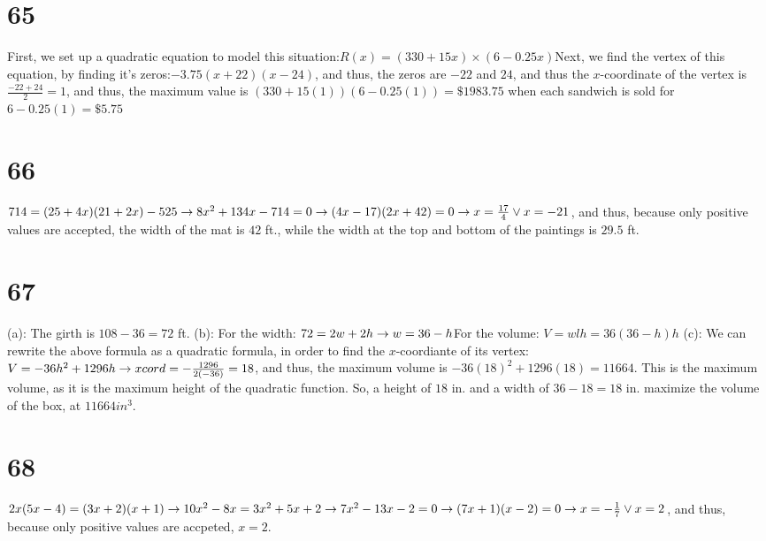 \documentclass{article}
\theoremstyle{definition}
\begin{document}
\section*{65}
First, we set up a quadratic equation to model this situation:\newline $R(x)=(330+15x)\times (6-0.25x)$\newline Next, we find the vertex of this equation, 
by finding it's zeros:\newline $-3.75(x+22)(x-24)$, and thus, the zeros are $-22$ and $24$, and thus the $x$-coordinate of the vertex is 
$\frac{-22+24}{2}=1$, and thus, the maximum value is $(330+15(1))(6-0.25(1))=\$1983.75$ when each sandwich is sold for $6-0.25(1)=\$5.75$

\section*{66}
$714=(25+4x)(21+2x)-525\newline\rightarrow 8x^2+134x-714=0\newline\rightarrow (4x-17)(2x+42)=0\newline\rightarrow x=\frac{17}{4}\vee x=-21$, and thus, 
because only positive values are accepted, the width of the mat is $42$ ft., while the width at the top and bottom of the paintings is $29.5$ ft.

\section*{67}
(a): The girth is $108-36=72$ ft.\newline
(b): For the width: $72=2w+2h\newline\rightarrow w=36-h$\newline For the volume: $V=wlh=36(36-h)h$\newline
(c): We can rewrite the above formula as a quadratic formula, in order to find the $x$-coordiante of its vertex:\newline
$V=-36h^2+1296h\newline\rightarrow x cord =-\frac{1296}{2(-36)}=18$, and thus, the maximum volume is $-36(18)^2+1296(18)=11664$. This is the 
maximum volume, as it is the maximum height of the quadratic function. So, a height of $18$ in. and a width of $36-18=18$ in. maximize the 
volume of the box, at $11664 in^3$.

\section*{68}
$2x(5x-4)=(3x+2)(x+1)\newline\rightarrow 10x^2-8x=3x^2+5x+2\newline\rightarrow 7x^2-13x-2=0\newline\rightarrow (7x+1)(x-2)=0\newline\rightarrow 
x=-\frac{1}{7}\vee x=2$, and thus, because only positive values are accpeted, $x=2$. 
\end{document}
